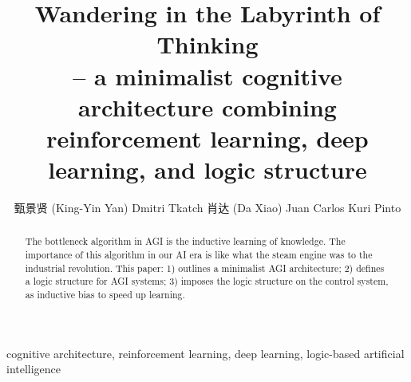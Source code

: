 \documentclass[orivec]{llncs}
\title{Wandering in the Labyrinth of Thinking\\
\normalsize{-- a minimalist cognitive architecture combining\\
reinforcement learning, deep learning, and logic structure}}
\author{
甄景贤 (King-Yin Yan) \quad Dmitri Tkatch \quad 肖达 (Da Xiao) \quad Juan Carlos Kuri Pinto
}
\institute{General.Intelligence@Gmail.com}
\begin{document}
\maketitle

\setlength{\parindent}{0em}
\setlength{\parskip}{2.8ex plus0.8ex minus0.8ex}

\begin{abstract}
The bottleneck algorithm in AGI is the inductive learning of knowledge.  The importance of this algorithm in our AI era is like what the steam engine was to the industrial revolution.  This paper: 1) outlines a minimalist AGI architecture; 2) defines a logic structure for AGI systems; 3) imposes the logic structure on the control system, as inductive bias to speed up learning.
\end{abstract}

\begin{keywords}
cognitive architecture, reinforcement learning, deep learning, logic-based artificial intelligence
\end{keywords}

\end{document}
